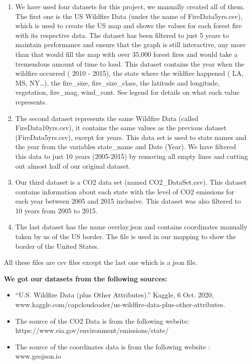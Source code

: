 \documentclass[fontsize=11pt]{article}
\begin{document}
\begin{enumerate}
    \item We have used four datasets for this project, we manually created all of them. The first one is the US Wildfire Data (under the name of FireData5yrs.csv), which is used to create the US map and shows the values for each forest fire with its respective data. The dataset has been filtered to just 5 years to maintain performance and ensure that the graph is still interactive, any more than that would fill the map with over 35,000 forest fires and would take a tremendous amount of time to load. This dataset contains the year when the wildfire occurred ( 2010 -  2015), the state where the wildfire happened ( LA, MS, NY…), the fire\_size, fire\_size\_class, the latitude and longitude, vegetation, fire\_mag,  wind\_cont. See legend for details on what each value represents.
    \item The second dataset represents the same Wildfire Data (called FireData10yrs.csv), it contains the same values as the previous dataset (FireData5yrs.csv), except for years. This data set is used to state names and the year from the variables state\_name and Date (Year). We have filtered this data to just 10 years (2005-2015) by removing all empty lines and cutting out almost half of our original dataset.
    \item Our third dataset is a CO2 data set (named CO2\_DataSet.csv). This dataset contains information about each state with the level of CO2 emissions for each year between 2005 and 2015 inclusive. This dataset was also filtered to 10 years from 2005 to 2015.
    \item The last dataset has the name overlay.json and contains coordinates manually taken by us of the US border. The file is used in our mapping to show the border of the United States.  

\end{enumerate}
All these files are csv files except the last one which is a json file.

\noindent\textbf{We got our datasets from the following sources:}
\begin{itemize}
    \item “U.S. Wildfire Data (plus Other Attributes).” Kaggle, 6 Oct. 2020, www.kaggle.com/capcloudcoder/us-wildfire-data-plus-other-attributes.
    \item The source of the CO2 Data is from the following website: https://www.eia.gov/environment/emissions/state/
    \item The source of the coordinates data is from the following website : www.geojson.io
\end{itemize}
\end{document}
